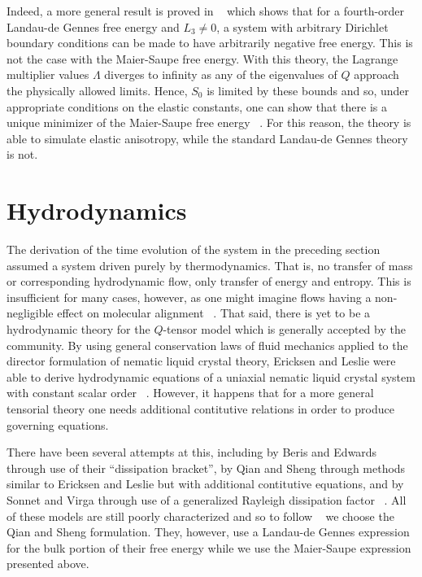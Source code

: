 \documentclass[reqno]{article}
\begin{document}
  Indeed, a more general result is proved in ~\cite{ball_nematic_2010} which
  shows that for a fourth-order Landau-de Gennes free energy and $L_3 \neq 0$, a system with
  arbitrary Dirichlet boundary conditions can be made to have arbitrarily
  negative free energy.
  This is not the case with the Maier-Saupe free energy.
  With this theory, the Lagrange multiplier values $\Lambda$ diverges to
  infinity as any of the eigenvalues of $Q$ approach the physically allowed
  limits.
  Hence, $S_0$ is limited by these bounds and so, under appropriate conditions
  on the elastic constants, one can show that there is a unique minimizer of the
  Maier-Saupe free energy ~\cite{schimming_numerical_2021}.
  For this reason, the theory is able to simulate elastic anisotropy, while the
  standard Landau-de Gennes theory is not.


  \section{Hydrodynamics}
  The derivation of the time evolution of the system in the preceding section
  assumed a system driven purely by thermodynamics.
  That is, no transfer of mass or corresponding hydrodynamic flow, only transfer of energy and entropy.
  This is insufficient for many cases, however, as one might imagine flows
  having a non-negligible effect on molecular alignment
  ~\cite{svensek_hydrodynamics_2002, toth_hydrodynamics_2002}.
  That said, there is yet to be a hydrodynamic theory for the $Q$-tensor model
  which is generally accepted by the community.
  By using general conservation laws of fluid mechanics applied to the director
  formulation of nematic liquid crystal theory, Ericksen and Leslie were able to
  derive hydrodynamic equations of a uniaxial nematic liquid crystal system with
  constant scalar order ~\cite{ericksen_hydrostatic_1962, Leslie1968}.
  However, it happens that for a more general tensorial theory one needs
  additional contitutive relations in order to produce governing equations.

  There have been several attempts at this, including by Beris and Edwards
  through use of their ``dissipation bracket'', by Qian and Sheng through
  methods similar to Ericksen and Leslie but with additional contitutive
  equations, and by Sonnet and Virga through use of a generalized Rayleigh
  dissipation factor ~\cite{Beris1994, qian_generalized_1998, sonnet_dissipative_2012}.
  All of these models are still poorly characterized and so to follow
  ~\cite{svensek_hydrodynamics_2002} we choose the Qian and Sheng
  formulation.
  They, however, use a Landau-de Gennes expression for the bulk portion of their
  free energy while we use the Maier-Saupe expression presented above.
\end{document}
